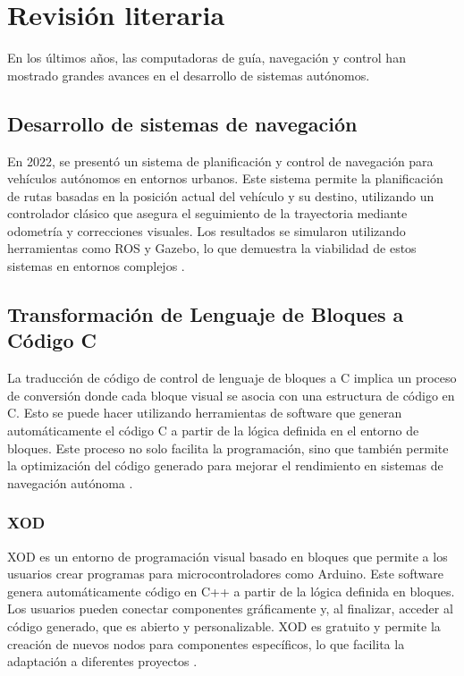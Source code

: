\section{Revisión literaria}
En los últimos años, las computadoras de guía, navegación y control han mostrado grandes avances en el desarrollo de sistemas autónomos.

\subsection{Desarrollo de sistemas de navegación}

En 2022, se presentó un sistema de planificación y control de navegación para vehículos autónomos en entornos urbanos. Este sistema permite la planificación de rutas basadas en la posición actual del vehículo y su destino, utilizando un controlador clásico que asegura el seguimiento de la trayectoria mediante odometría y correcciones visuales. Los resultados se simularon utilizando herramientas como ROS y Gazebo, lo que demuestra la viabilidad de estos sistemas en entornos complejos \cite{BarreraRamrez2022SistemaDP}. 

\subsection{Transformación de Lenguaje de Bloques a Código C}

La traducción de código de control de lenguaje de bloques a C implica un proceso de conversión donde cada bloque visual se asocia con una estructura de código en C. Esto se puede hacer utilizando herramientas de software que generan automáticamente el código C a partir de la lógica definida en el entorno de bloques. Este proceso no solo facilita la programación, sino que también permite la optimización del código generado para mejorar el rendimiento en sistemas de navegación autónoma \cite{elert2020programming}.

\subsubsection{XOD}

XOD es un entorno de programación visual basado en bloques que permite a los usuarios crear programas para microcontroladores como Arduino. Este software genera automáticamente código en C++ a partir de la lógica definida en bloques. Los usuarios pueden conectar componentes gráficamente y, al finalizar, acceder al código generado, que es abierto y personalizable. XOD es gratuito y permite la creación de nuevos nodos para componentes específicos, lo que facilita la adaptación a diferentes proyectos \cite{Snchez2020ProgramacinDL}.

